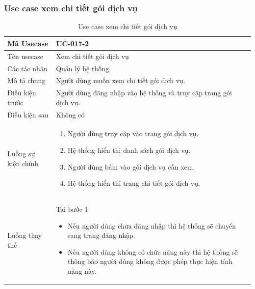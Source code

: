 \documentclass[12pt,a4paper]{article}
\begin{document}
    \subsubsection*{Use case xem chi tiết gói dịch vụ }
    \begin{table}[H]
        \centering
        \begin{tabular}{|p{3.5cm}|p{11.5cm}|c|}
            \hline
            Mã Usecase      & UC-017-2                                                         \\
            \hline
            Tên usecase     & Xem chi tiết gói dịch vụ                                         \\
            \hline
            Các tác nhân    & Quản lý hệ thống                                                 \\
            \hline
            Mô tả chung     & Người dùng muốn xem chi tiết gói dịch vụ.                        \\
            \hline

            Điều kiện trước & Người dùng đăng nhập vào hệ thống và truy cập trang gói dịch vụ. \\
            \hline

            Điều kiện sau   & Không có                                                         \\
            \hline

            Luồng sự kiện chính & \vspace{-.8cm}\begin{enumerate}
                                                    \item Người dùng truy cập vào trang gói dịch vụ.
                                                    \item Hệ thống hiển thị danh sách gói dịch vụ.
                                                    \item Người dùng bấm vào gói dịch vụ cần xem.
                                                    \item Hệ thống hiển thị trang chi tiết gói dịch vụ.
            \end{enumerate}
            \\
            \hline
            Luồng thay thế & Tại bước 1\newline
            \vspace{-.8cm}\begin{itemize}
                              \item Nếu người dùng chưa đăng nhập thì hệ thống sẽ chuyển sang trang đăng nhập.
                              \item  Nếu người dùng không có chức năng này thì hệ thống sẽ thông báo người dùng không được phép thực hiện tính năng này.
            \end{itemize}

            \\    \hline
        \end{tabular}
        \caption{Use case xem chi tiết gói dịch vụ }
    \end{table}
\end{document}
